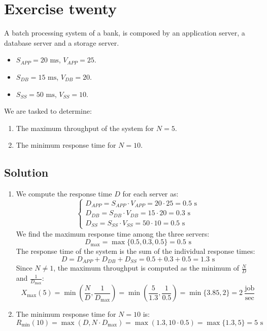 \section{Exercise twenty}

A batch processing system of a bank, is composed by an application server, a database server and a storage server.
\begin{itemize}
    \item $S_{APP} = 20\text{ ms}$, $V_{APP} = 25$.
    \item $S_{DB} = 15\text{ ms}$, $V_{DB} = 20$.
    \item $S_{SS} = 50\text{ ms}$, $V_{SS} = 10$.
\end{itemize}
We are tasked to determine:
\begin{enumerate}
    \item The maximum throughput of the system for $N = 5$.
    \item The minimum response time for $N = 10$.
\end{enumerate}

\subsection*{Solution}
\begin{enumerate}
    \item We compute the response time $D$ for each server as:
        \[\begin{cases}
            D_{APP}=S_{APP}\cdot V_{APP}= 20 \cdot 25 = 0.5\text{ s} \\
            D_{DB}=S_{DB}\cdot V_{DB}= 15 \cdot 20 = 0.3\text{ s} \\
            D_{SS}=S_{SS}\cdot V_{SS}= 50 \cdot 10 = 0.5\text{ s}
        \end{cases}\]
        We find the maximum response time among the three servers:
        \[D_{\max}=\max\{0.5,0.3,0.5\}=0.5\text{ s}\]
        The response time of the system is the sum of the individual response times:
        \[D=D_{APP}+D_{DB}+D_{SS}=0.5+0.3+0.5=1.3\text{ s}\]
        Since $N \neq 1$, the maximum throughput is computed as the minimum of $\frac{N}{D}$ and $\frac{1}{D_{\max}}$:
        \[X_{\max}(5)=\min\left(\dfrac{N}{D},\dfrac{1}{D_{\max}}\right)=\min\left(\dfrac{5}{1.3},\dfrac{1}{0.5}\right)=\min\{3.85,2\}=2\:\dfrac{\text{job}}{\text{sec}}\]
    \item The minimum response time for $N = 10$ is:
        \[R_{\min}(10)=\max\left(D,N\cdot D_{\max}\right)=\max\left(1.3,10\cdot 0.5\right)=\max\{1.3,5\}=5\text{ s}\]
\end{enumerate}